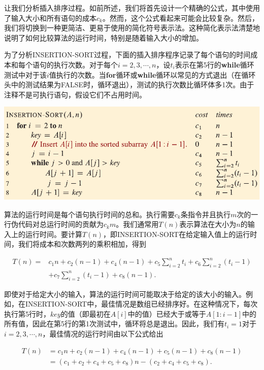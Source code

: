 \documentclass[lang=cn,newtx,10pt,scheme=chinese]{elegantbook}
\begin{document}
让我们分析插入排序过程。如前所述，我们将首先设计一个精确的公式，其中使用了输入大小和所有语句的成本$c_k$。然而，这个公式看起来可能会比较复杂。然后，我们将切换到一种更简洁、更易于使用的简化符号表示法。这种简化表示法清楚地说明了如何比较算法的运行时间，特别是随着输入大小的增加。

为了分析INSERTION-SORT过程，下面的插入排序程序记录了每个语句的时间成本和每个语句的执行次数。对于每个$i=2,3,\cdots,n$，设$t_i$表示在第5行的\textbf{while}循环测试中对于该$i$值执行的次数。当\textbf{for}循环或\textbf{while}循环以常见的方式退出（在循环头中的测试结果为FALSE时，循环退出），测试的执行次数比循环体多1次。由于注释不是可执行语句，假设它们不占用时间。

\includegraphics{算法导论第四版插图/第二章/插入排序时间复杂度的代码.pdf}

算法的运行时间是每个语句执行时间的总和。执行需要$c_k$条指令并且执行$m$次的一行伪代码对总运行时间的贡献为$c_km$。我们通常用$T(n)$表示算法在大小为$n$的输入上的运行时间。要计算$T(n)$，即INSERTION-SORT在给定输入值上的运行时间，我们将成本和次数两列的乘积相加，得到

\begin{equation*}
\begin{aligned}
T(n)= & c_1 n+c_2(n-1)+c_4(n-1)+c_5 \sum_{i=2}^n t_i+c_6 \sum_{i=2}^n\left(t_i-1\right) \\
& +c_7 \sum_{i=2}^n\left(t_i-1\right)+c_8(n-1) .
\end{aligned}
\end{equation*}

即使对于给定大小的输入，算法的运行时间可能取决于给定的该大小的输入。例如，在INSERTION-SORT中，最佳情况是数组已经排序好。在这种情况下，每次执行第5行时，$key$的值（即最初在$A[i]$中的值）已经大于或等于$A[1:i-1]$中的所有值，因此在第5行的第1次测试中，循环将总是退出。因此，我们有$t_i=1$对于$i=2,3,\cdots,n$，最佳情况的运行时间由以下公式给出

\begin{equation}\label{eq:2.1}
\begin{aligned}
T(n) & =c_1 n+c_2(n-1)+c_4(n-1)+c_5(n-1)+c_8(n-1) \\
& =\left(c_1+c_2+c_4+c_5+c_8\right) n-\left(c_2+c_4+c_5+c_8\right) .
\end{aligned}
\end{equation}
\end{document}
